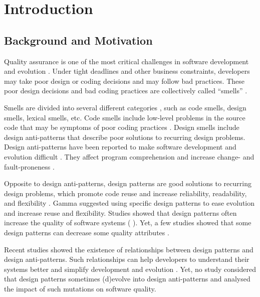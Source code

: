 \section{Introduction}
\label{sec:introduction}

\subsection{Background and Motivation}

Quality assurance is one of the most critical challenges in software development and evolution \cite{gamma1995design}. Under tight deadlines and other business constraints, developers may take poor design or coding decisions and may follow bad practices. These poor design decisions and bad coding practices are collectively called ``smells'' \cite{stamelos2002code,khomh2007perception}.

Smells are divided into several different categories \cite{fowler1999refactoring}, such as code smells, design smells, lexical smells, etc. Code smells include low-level problems in the source code that may be symptoms of poor coding practices \cite{van2002java,mantyla2003taxonomy}. Design smells include design anti-patterns that describe poor solutions to recurring design problems. Design anti-patterns have been reported to make software development and evolution difficult \cite{khomh2012exploratory}. They affect program comprehension \cite{abbes2011empirical} and increase change- and fault-proneness \cite{khomh2012exploratory}. 

Opposite to design anti-patterns, design patterns are good solutions to recurring design problems, which promote code reuse and increase reliability, readability, and flexibility \cite{gamma1995design}. Gamma \etal \cite{gamma1995design} suggested using specific design patterns to ease evolution and increase reuse and flexibility. Studies showed that design patterns often increase the quality of software systems (\eg{} \cite{ampatzoglou2012methodology}). Yet, a few studies showed that some design patterns can decrease some quality attributes \cite{khomh2008design}. 

Recent studies \cite{jaafar2013analysing,vokavc2004defect,aversano2007empirical} showed the existence of relationships between design patterns and design anti-patterns. Such relationships can help developers to understand their systems better and simplify development and evolution \cite{jaafar2013analysing}. Yet, no study considered that design patterns sometimes (d)evolve into design anti-patterns and analysed the impact of such mutations on software quality. 

